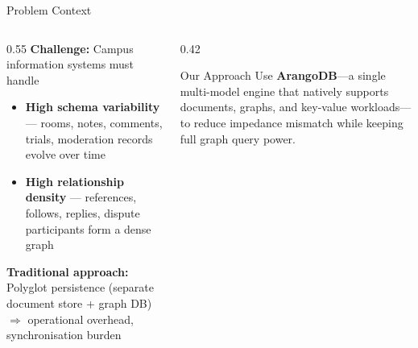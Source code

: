 \documentclass[aspectratio=169,11pt]{beamer}
\begin{document}
\begin{frame}{Problem Context}
  \begin{columns}[T]
    \begin{column}{0.55\textwidth}
      \textbf{Challenge:} Campus information systems must handle
      \begin{itemize}
        \item \textbf{High schema variability} --- rooms, notes, comments,
              trials, moderation records evolve over time
        \item \textbf{High relationship density} --- references, follows,
              replies, dispute participants form a dense graph
      \end{itemize}
      \vspace{0.5em}
      \textbf{Traditional approach:}
      Polyglot persistence (separate document store + graph DB)
      $\Rightarrow$ operational overhead, synchronisation burden
      \cite{stonebraker2005onesize, sadalage2012nosql}
    \end{column}
    \begin{column}{0.42\textwidth}
      \begin{block}{Our Approach}
        Use \textbf{ArangoDB}---a single multi-model engine that
        natively supports documents, graphs, and key-value
        workloads---to reduce impedance mismatch while keeping
        full graph query power.
      \end{block}
    \end{column}
  \end{columns}
\end{frame}
\end{document}
